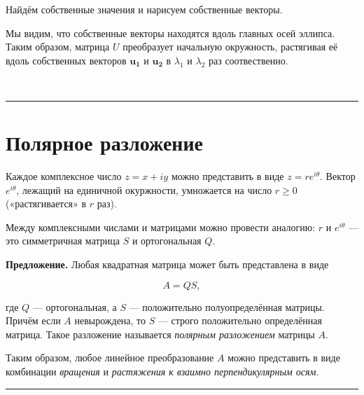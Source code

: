\documentclass[11pt,a4paper]{article}
\renewcommand{\linethickness}{0.1ex}
\begin{document}
Найдём собственные значения и нарисуем собственные векторы.

Мы видим, что собственные векторы находятся вдоль главных осей эллипса.
Таким образом, матрица \(U\) преобразует начальную окружность,
растягивая её вдоль собственных векторов \(\mathbf{u_1}\) и
\(\mathbf{u_2}\) в \(\lambda_1\) и \(\lambda_2\) раз соотвественно.

    \begin{center}
    \end{center}
    { \hspace*{\fill} \\}
    
    \begin{center}\rule{0.5\linewidth}{\linethickness}\end{center}

    \hypertarget{ux43fux43eux43bux44fux440ux43dux43eux435-ux440ux430ux437ux43bux43eux436ux435ux43dux438ux435}{%
\section{Полярное
разложение}\label{ux43fux43eux43bux44fux440ux43dux43eux435-ux440ux430ux437ux43bux43eux436ux435ux43dux438ux435}}

Каждое комплексное число \(z = x + iy\) можно представить в виде
\(z = r e^{i\theta}\). Вектор \(e^{i\theta}\), лежащий на единичной
окуржности, умножается на число \(r \ge 0\) («растягивается» в \(r\)
раз).

Между комплексными числами и матрицами можно провести аналогию: \(r\) и
\(e^{i\theta}\) --- это симметричная матрица \(S\) и ортогональная
\(Q\).

\textbf{Предложение.} Любая квадратная матрица может быть представлена в
виде

\[ A = QS, \]

где \(Q\) --- ортогональная, а \(S\) --- положительно полуопределённая
матрицы. Причём если \(A\) невырождена, то \(S\) --- строго положительно
определённая матрица. Такое разложение называется \emph{полярным
разложением} матрицы \(A\).

Таким образом, любое линейное преобразование \(A\) можно представить в
виде комбинации \emph{вращения} и \emph{растяжения к взаимно
перпендикулярным осям}.

    \begin{center}\rule{0.5\linewidth}{\linethickness}\end{center}
\end{document}
